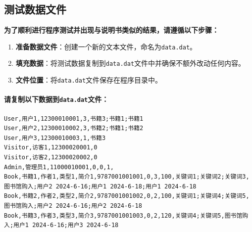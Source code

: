 \documentclass[12pt,twoside]{ctexart}
\begin{document}
\newpage
\subsection{测试数据文件}
\label{sec:datafiles}

\textbf{为了顺利进行程序测试并出现与说明书类似的结果，请遵循以下步骤：}

\begin{enumerate}
    \item \textbf{准备数据文件}：创建一个新的文本文件，命名为\texttt{data.dat}。
    \item \textbf{填充数据}：将测试数据复制到\texttt{data.dat}文件中并确保不额外改动任何内容。
    \item \textbf{文件位置}：将\texttt{data.dat}文件保存在程序目录中。
\end{enumerate}

\bigskip %


\paragraph{请复制以下数据到\texttt{data.dat}文件：}
\begin{mdframed}

    \begin{verbatim}
User,用户1,12300010001,3,书籍3;书籍1;书籍1
User,用户2,12300010002,3,书籍2;书籍1;书籍2
User,用户3,12300010003,1,书籍3
Visitor,访客1,12300020001,0
Visitor,访客2,12300020002,0
Admin,管理员1,11000010001,0,0,1,
Book,书籍1,作者1,类型1,简介1,9787001001001,0,3,100,关键词1;关键词2;关键词3,图书馆购入;用户2 2024-6-16;用户1 2024-6-18;用户1 2024-6-18
Book,书籍2,作者2,类型2,简介2,9787001001002,0,2,100,关键词1;关键词4;关键词5,图书馆购入;用户2 2024-6-16;用户2 2024-6-18
Book,书籍3,作者3,类型3,简介3,9787001001003,0,2,120,关键词4;关键词5,图书馆购入;用户1 2024-6-16;用户3 2024-6-18
\end{verbatim}
\end{mdframed}
\end{document}
